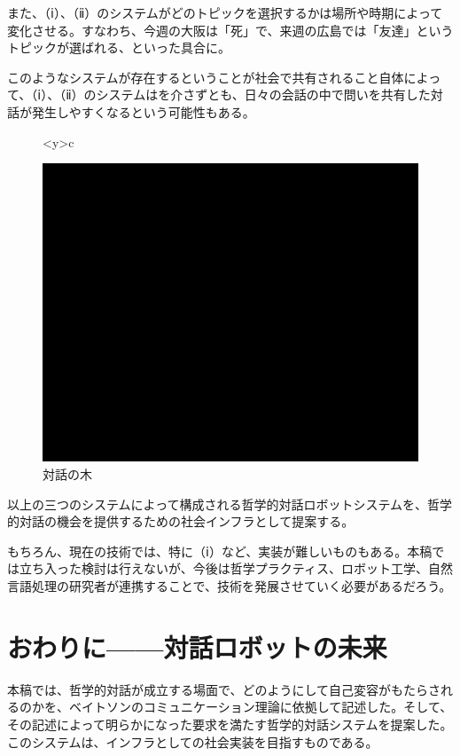 \documentclass[b5j,twoside,twocolumn]{utarticle}
\begin{document}
また、（ⅰ）、（ⅱ）のシステムがどのトピックを選択するかは場所や時期によって変化させる。すなわち、今週の大阪は「死」で、来週の広島では「友達」というトピックが選ばれる、といった具合に。

このようなシステムが存在するということが社会で共有されること自体によって、（ⅰ）、（ⅱ）のシステムはを介さずとも、日々の会話の中で問いを共有した対話が発生しやすくなるという可能性もある。
\begin{figure}[h]
\centering
\begin{tabular}<y>{c}
\begin{minipage}[c]{0.65\hsize}
\centering
\includegraphics[scale=0.5]{system3}
\caption{対話の木}
\end{minipage}
\end{tabular}
\end{figure}

以上の三つのシステムによって構成される哲学的対話ロボットシステムを、哲学的対話の機会を提供するための社会インフラとして提案する。

もちろん、現在の技術では、特に（ⅰ）など、実装が難しいものもある。本稿では立ち入った検討は行えないが、今後は哲学プラクティス、ロボット工学、自然言語処理の研究者が連携することで、技術を発展させていく必要があるだろう。


\section{おわりに------対話ロボットの未来}
本稿では、哲学的対話が成立する場面で、どのようにして自己変容がもたらされるのかを、ベイトソンのコミュニケーション理論に依拠して記述した。そして、その記述によって明らかになった要求を満たす哲学的対話システムを提案した。このシステムは、インフラとしての社会実装を目指すものである。
\end{document}
